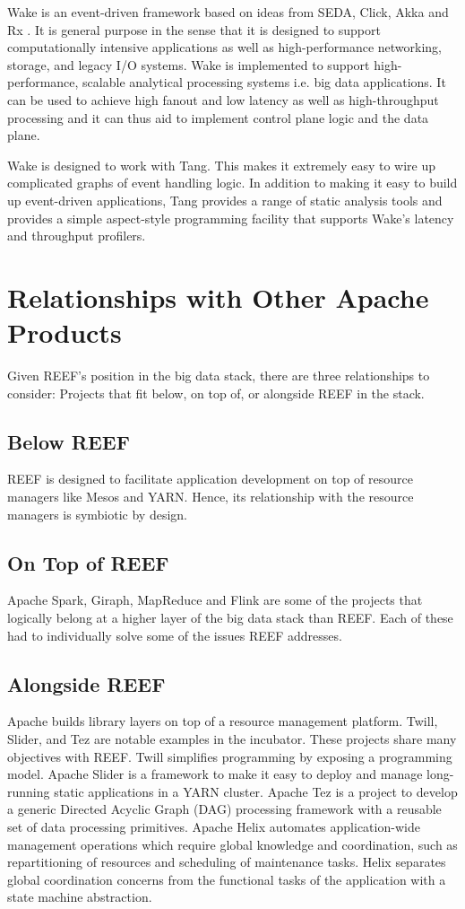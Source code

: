 \documentclass[9pt,twocolumn,twoside]{../../styles/osajnl}
\begin{document}
Wake is an event-driven framework based on ideas from SEDA, Click,
Akka and Rx \cite{reefwake}. It is general purpose in the sense that
it is designed to support computationally intensive applications as
well as high-performance networking, storage, and legacy I/O
systems. Wake is implemented to support high-performance, scalable
analytical processing systems i.e. big data applications. It can be
used to achieve high fanout and low latency as well as high-throughput
processing and it can thus aid to implement control plane logic and
the data plane.

Wake is designed to work with Tang. This makes it extremely easy to
wire up complicated graphs of event handling logic. In addition to
making it easy to build up event-driven applications, Tang provides a
range of static analysis tools and provides a simple aspect-style
programming facility that supports Wake’s latency and throughput
profilers.

\section{Relationships with Other Apache Products}

Given REEF's position in the big data stack, there are three
relationships to consider: Projects that fit below, on top of, or
alongside REEF in the stack.

\subsection{Below REEF}
REEF is designed to facilitate application development on top of
resource managers like Mesos and YARN. Hence, its relationship with
the resource managers is symbiotic by design.

\subsection{On Top of REEF}
Apache Spark, Giraph, MapReduce and Flink are some of the projects
that logically belong at a higher layer of the big data stack than
REEF. Each of these had to individually solve some of the issues REEF
addresses.

\subsection{Alongside REEF}

Apache builds library layers on top of a resource management
platform. Twill, Slider, and Tez are notable examples in the
incubator. These projects share many objectives with REEF. Twill
simplifies programming by exposing a programming model. Apache Slider
is a framework to make it easy to deploy and manage long-running
static applications in a YARN cluster. Apache Tez is a project to
develop a generic Directed Acyclic Graph (DAG) processing framework
with a reusable set of data processing primitives. Apache Helix
automates application-wide management operations which require global
knowledge and coordination, such as repartitioning of resources and
scheduling of maintenance tasks. Helix separates global coordination
concerns from the functional tasks of the application with a state
machine abstraction.
\end{document}

